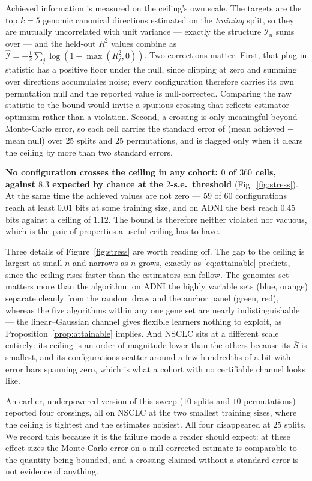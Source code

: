 \documentclass{article}
\begin{document}
Achieved information is measured on the ceiling's own scale. The targets are the
top $k=5$ genomic canonical directions estimated on the \emph{training} split,
so they are mutually uncorrelated with unit variance --- exactly the structure
$\mathcal{I}_n$ sums over --- and the held-out $R^2$ values combine as
$\hat{\mathcal{I}} = -\tfrac12\sum_j\log(1-\max(R_j^2,0))$. Two corrections
matter. First, that plug-in statistic has a positive floor under the null, since
clipping at zero and summing over directions accumulates noise; every
configuration therefore carries its own permutation null and the reported value
is null-corrected. Comparing the raw statistic to the bound would invite a
spurious crossing that reflects estimator optimism rather than a violation.
Second, a crossing is only meaningful beyond Monte-Carlo error, so each cell
carries the standard error of (mean achieved $-$ mean null) over $25$ splits and
$25$ permutations, and is flagged only when it clears the ceiling by more than
two standard errors.

\textbf{No configuration crosses the ceiling in any cohort: $0$ of $360$ cells,
against $8.3$ expected by chance at the $2$-s.e.\ threshold}
(Fig.~\ref{fig:stress}). At the same time the achieved values are not zero ---
$59$ of $60$ configurations reach at least $0.01$ bits at some training size,
and on ADNI the best reach $0.45$ bits against a ceiling of $1.12$. The bound is
therefore neither violated nor vacuous, which is the pair of properties a useful
ceiling has to have.

Three details of Figure~\ref{fig:stress} are worth reading off. The gap to the
ceiling is largest at small $n$ and narrows as $n$ grows, exactly as
\eqref{eq:attainable} predicts, since the ceiling rises faster than the
estimators can follow. The genomics set matters more than the algorithm: on ADNI
the highly variable sets (blue, orange) separate cleanly from the random draw
and the anchor panel (green, red), whereas the five algorithms within any one
gene set are nearly indistinguishable --- the linear--Gaussian channel gives
flexible learners nothing to exploit, as Proposition~\ref{prop:attainable}
implies. And NSCLC sits at a different scale entirely: its ceiling is an order of
magnitude lower than the others because its $\bar S$ is smallest, and its
configurations scatter around a few hundredths of a bit with error bars spanning
zero, which is what a cohort with no certifiable channel looks like.

An earlier, underpowered version of this sweep ($10$ splits and $10$
permutations) reported four crossings, all on NSCLC at the two smallest training
sizes, where the ceiling is tightest and the estimates noisiest. All four
disappeared at $25$ splits. We record this because it is the failure mode a
reader should expect: at these effect sizes the Monte-Carlo error on a
null-corrected estimate is comparable to the quantity being bounded, and a
crossing claimed without a standard error is not evidence of anything.
\end{document}
